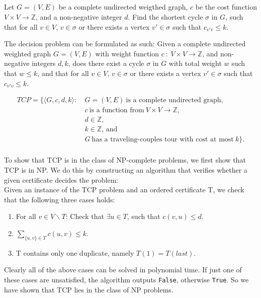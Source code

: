 \subsection{}

Let $G = (V,E)$ be a complete undirected weigthed graph, $c$ be the
cost function $V \times V \to \mathbb{Z}$, and a non-negative integer
$d$. Find the shortest cycle $\sigma$ in $G$, such that for all $v \in
V$, $v \in \sigma$ or there exists a vertex $v' \in \sigma$ such that
$c_{v'v} \leq k$.

The decision problem can be formulated as such: Given a complete
undirected weighted graph $G=(V,E)$ with weight function $c ~ : ~ V
\times V \to \mathbb{Z}$, and non-negative integers $d,k$, does there
exist a cycle $\sigma$ in $G$ with total weight $w$ such that $w \leq
k$, and that for all $v \in V$, $v \in \sigma$ or there exists a
vertex $v' \in \sigma$ such that $c_{v'v} \leq k$.

\begin{align*}
  TCP = \{ \langle G, c, d, k \rangle : ~ & G = (V,E) ~ \text{is a complete
    undirected graph}, \\
  & c ~ \text{is a function from} ~ V \times V \to \mathbb{Z}, \\
  & d \in \mathbb{Z}, \\ 
  & k \in \mathbb{Z} \textrm{, and} \\
  & G ~\text{has a traveling-couples tour with cost at most} ~ k\} .\\
\end{align*}

To show that TCP is in the class of NP-complete problems, we first show that
TCP is in NP. We do this by constructing an algorithm that verifies whether a
given certificate decides the problem:\\

Given an instance of the TCP problem and an ordered certificate T, we check
that the following three cases holds:

\begin{enumerate}
  \item {For all $v \in V\backslash T$: Check that $\exists u \in T$, such
  that $c(v,u) \leq d$.}
  \item {$\sum_{\{u,v\} \in T} c(u,v) \leq k$.}
  \item {T contains only one duplicate, namely $T(1) = T(last)$.}
\end{enumerate}

Clearly all of the above cases can be solved in polynomial time. If just
one of these cases are unsatisfied, the algorithm outputs \texttt{False},
otherwise \texttt{True}. So we have shown that TCP lies in the class of NP
problems.\\

